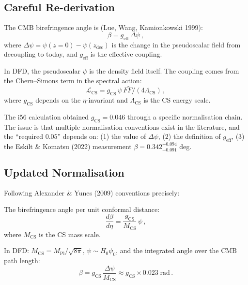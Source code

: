 \documentclass[11pt,a4paper]{article}
\begin{document}
\subsection{Careful Re-derivation}

The CMB birefringence angle is (Lue, Wang, Kamionkowski 1999):
\begin{equation}
\beta = g_{\mathrm{eff}}\,\Delta\psi\,,
\end{equation}
where $\Delta\psi = \psi(z = 0) - \psi(z_{\mathrm{dec}})$ is the change in the pseudoscalar field from decoupling to today, and $g_{\mathrm{eff}}$ is the effective coupling.

In DFD, the pseudoscalar $\psi$ is the density field itself. The coupling comes from the Chern--Simons term in the spectral action:
\begin{equation}
\mathcal{L}_{\mathrm{CS}} = g_{\mathrm{CS}}\,\psi\,F\tilde{F}/(4\Lambda_{\mathrm{CS}})\,,
\end{equation}
where $g_{\mathrm{CS}}$ depends on the $\eta$-invariant and $\Lambda_{\mathrm{CS}}$ is the CS energy scale.

The i56 calculation obtained $g_{\mathrm{CS}} = 0.046$ through a specific normalisation chain. The issue is that multiple normalisation conventions exist in the literature, and the ``required $0.05$'' depends on: (1) the value of $\Delta\psi$, (2) the definition of $g_{\mathrm{eff}}$, (3) the Eskilt \& Komatsu (2022) measurement $\beta = 0.342^{+0.094}_{-0.091}$ deg.

\subsection{Updated Normalisation}

Following Alexander \& Yunes (2009) conventions precisely:

The birefringence angle per unit conformal distance:
\begin{equation}
\frac{d\beta}{d\eta} = \frac{g_{\mathrm{CS}}}{M_{\mathrm{CS}}}\,\dot{\psi}\,,
\end{equation}
where $M_{\mathrm{CS}}$ is the CS mass scale.

In DFD: $M_{\mathrm{CS}} = M_{\mathrm{Pl}}/\sqrt{8\pi}$, $\dot{\psi} \sim H_0 \psi_0$, and the integrated angle over the CMB path length:
\begin{equation}
\beta = g_{\mathrm{CS}}\,\frac{\Delta\psi}{M_{\mathrm{CS}}} \approx g_{\mathrm{CS}} \times 0.023\;\mathrm{rad}\,.
\end{equation}
\end{document}
